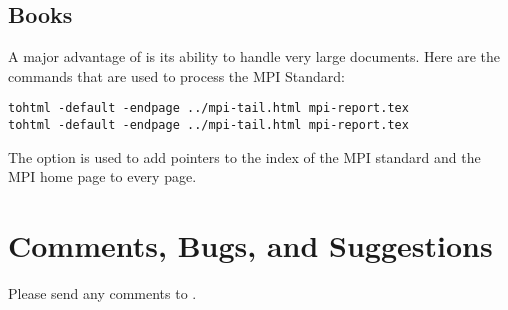\subsection{Books}
A major advantage of  is its ability to handle very large
documents.  Here are the commands that are used to process the MPI Standard:
\begin{verbatim}
tohtml -default -endpage ../mpi-tail.html mpi-report.tex
tohtml -default -endpage ../mpi-tail.html mpi-report.tex
\end{verbatim}
The  option is used to add pointers to the
index of the MPI standard and the MPI home page to every page.

\section{Comments, Bugs, and Suggestions}
Please send any comments to .

\begin{tex}

\end{tex}


